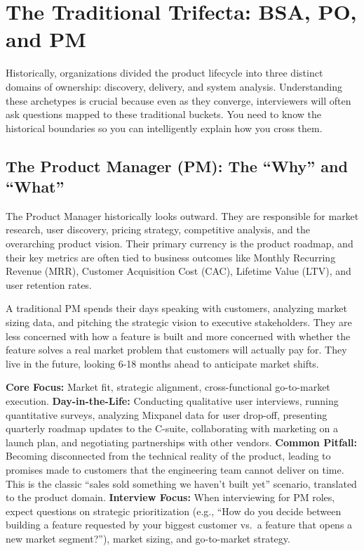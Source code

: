 \section{The Traditional Trifecta: BSA, PO, and
PM}\label{the-traditional-trifecta-bsa-po-and-pm}

Historically, organizations divided the product lifecycle into three
distinct domains of ownership: discovery, delivery, and system analysis.
Understanding these archetypes is crucial because even as they converge,
interviewers will often ask questions mapped to these traditional
buckets. You need to know the historical boundaries so you can
intelligently explain how you cross them.

\subsection{The Product Manager (PM): The ``Why'' and
``What''}\label{the-product-manager-pm-the-why-and-what}

The Product Manager historically looks outward. They are responsible for
market research, user discovery, pricing strategy, competitive analysis,
and the overarching product vision. Their primary currency is the
product roadmap, and their key metrics are often tied to business
outcomes like Monthly Recurring Revenue (MRR), Customer Acquisition Cost
(CAC), Lifetime Value (LTV), and user retention rates.

A traditional PM spends their days speaking with customers, analyzing
market sizing data, and pitching the strategic vision to executive
stakeholders. They are less concerned with how a feature is built and
more concerned with whether the feature solves a real market problem
that customers will actually pay for. They live in the future, looking
6-18 months ahead to anticipate market shifts.

\textbf{Core Focus:} Market fit, strategic alignment, cross-functional
go-to-market execution. \textbf{Day-in-the-Life:} Conducting qualitative
user interviews, running quantitative surveys, analyzing Mixpanel data
for user drop-off, presenting quarterly roadmap updates to the C-suite,
collaborating with marketing on a launch plan, and negotiating
partnerships with other vendors. \textbf{Common Pitfall:} Becoming
disconnected from the technical reality of the product, leading to
promises made to customers that the engineering team cannot deliver on
time. This is the classic ``sales sold something we haven't built yet''
scenario, translated to the product domain. \textbf{Interview Focus:}
When interviewing for PM roles, expect questions on strategic
prioritization (e.g., ``How do you decide between building a feature
requested by your biggest customer vs.~a feature that opens a new market
segment?''), market sizing, and go-to-market strategy.

